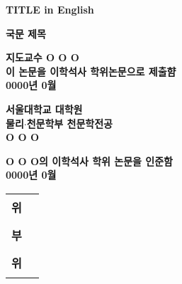 \begin{titlepage}
    \begin{center}
        
        \LARGE
        \textbf{TITLE in English}
        
        \vspace{1.0cm}
        \LARGE
        \textbf{국문 제목}
        
        \vspace{1.0cm}
        \Large
        \textbf{지도교수 O O O}\\
        \vspace{1.0cm}
        \textbf{이 논문을 이학석사 학위논문으로 제출햠}\\
        \textbf{0000년 0월}
        \vspace{1.0cm}

        \textbf{서울대학교 대학원}\\
        \textbf{물리$\cdot$천문학부 천문학전공}\\
        \textbf{O O O}

        \vspace{1.0cm}
        \textbf{O O O의 이학석사 학위 논문을 인준함}\\
        \textbf{0000년 0월}
        
        \vfill
      
        \begin{tabular}{cc}
        \textbf{위} & \rule{5.0cm}{1pt} \\
        \textbf{부} & \rule{5.0cm}{1.0pt}\\
        \textbf{위} & \rule{5.0cm}{1.0pt}\\
        \end{tabular}
        
    \end{center}
\end{titlepage}